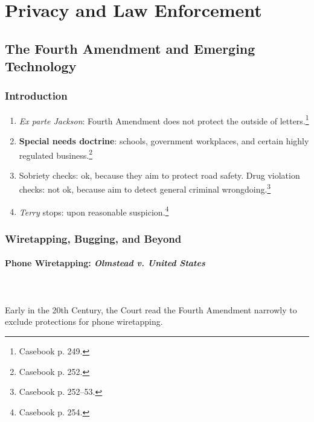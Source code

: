 \section{Privacy and Law Enforcement}

\subsection{The Fourth Amendment and Emerging Technology}

\subsubsection{Introduction}

\begin{enumerate}
    \item \emph{Ex parte Jackson}: Fourth Amendment does not protect the 
    outside of letters.\footnote{Casebook p. 249.}
    \item \textbf{Special needs doctrine}: schools, government workplaces, and 
    certain highly regulated business.\footnote{Casebook p. 252.}
    \item Sobriety checks: ok, because they aim to protect road safety. Drug 
    violation checks: not ok, because aim to detect general criminal 
    wrongdoing.\footnote{Casebook p. 252--53.}
    \item \emph{Terry} stops: upon reasonable suspicion.\footnote{Casebook p. 
    254.}
\end{enumerate}

\subsubsection{Wiretapping, Bugging, and Beyond}

\paragraph{Phone Wiretapping: \emph{Olmstead v. United States}}
~\\\\
Early in the 20th Century, the Court read the Fourth Amendment narrowly to 
exclude protections for phone wiretapping.


